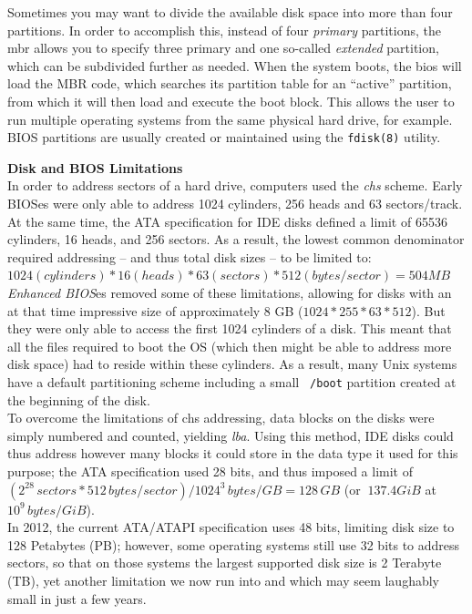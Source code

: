 Sometimes you may want to divide the available disk
space into more than four partitions.  In order to
accomplish this, instead of four {\em primary}
partitions, the \gls{mbr} allows you to specify three
primary and one so-called {\em extended} partition,
which can be subdivided further as needed.  When the
system boots, the \gls{bios} will load the MBR code, which
searches its partition table for an ``active''
partition, from which it will then load and execute
the boot block.  This allows the user to run multiple
operating systems from the same physical hard drive,
for example.  BIOS partitions are usually created or
maintained using the {\tt fdisk(8)}
utility.

\begin{sidenote}
{\bf Disk and BIOS Limitations} \\

In order to address sectors of a hard drive, computers
used the {\em
\gls{chs}}
scheme.  Early BIOSes were only able to address 1024
cylinders, 256 heads and 63 sectors/track.  At the
same time, the ATA specification for IDE disks defined
a limit of 65536 cylinders, 16 heads, and 256 sectors.
As a result, the lowest common denominator required
addressing -- and thus total disk sizes -- to be
limited to:\\ [10pt]

$1024 (cylinders) * 16 (heads) * 63 (sectors) * 512 (bytes / sector) = 504 MB $ \\[10pt]

{\em Enhanced BIOS}es removed some of these
limitations, allowing for disks with an at that time
impressive size of approximately 8 GB ($1024 * 255 *
63 * 512$).  But they were only able to access the
first 1024 cylinders of a disk.  This meant that all
the files required to boot the OS (which then might be
able to address more disk space) had to reside within
these cylinders.  As a result, many Unix systems have
a default partitioning scheme including a small {\tt
/boot} partition created at the beginning of the disk.
\\ [10pt]

To overcome the limitations of
\gls{chs}
addressing, data blocks on the disks were simply
numbered and counted, yielding {\em
\gls{lba}}.  Using
this method, IDE disks could thus address however many
blocks it could store in the data type it used for
this purpose; the ATA specification used 28 bits, and
thus imposed a limit of $(2^{28}\,sectors * 512\,
bytes/sector)/1024^3\, bytes/GB = 128\, GB$ (or
$~137.4GiB$ at $10^9\, bytes/GiB$). \\ [10pt]

In 2012, the current ATA/ATAPI
specification uses 48 bits, limiting disk size to 128
Petabytes (PB); however, some operating systems still
use 32 bits to address sectors, so that on those
systems the largest supported disk size is 2 Terabyte
(TB), yet another limitation we now run into and which
may seem laughably small in just a few years.
\end{sidenote}


